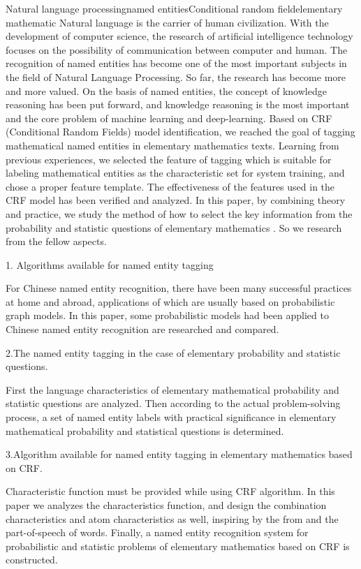 
\begin{Eabstract}{Natural language processing}{named entities}{Conditional random field}{elementary mathematic}{}
Natural language is the carrier of human civilization. With the development of computer science, the research of artificial intelligence technology focuses on the possibility of communication between computer and human. The recognition of named entities has become one of the most important subjects in the field of Natural Language Processing. So far, the research has become more and more valued. On the basis of named entities, the concept of knowledge reasoning has been put forward, and knowledge reasoning is the most important and the core problem of machine learning and deep-learning. 
Based on CRF (Conditional Random Fields) model identification, we reached the goal of tagging mathematical named entities in elementary mathematics texts. Learning from previous experiences, we selected the feature of tagging which is suitable for labeling mathematical entities as the characteristic set for system training, and chose a proper feature template. The effectiveness of the features used in the CRF model has been verified and analyzed. 
In this paper, by combining theory and practice, we study the method of how to select the key information from the probability and statistic questions of elementary mathematics . So we research from the fellow aspects.

1. Algorithms available for named entity tagging

For Chinese named entity recognition, there have been many successful practices at home and abroad, applications of which are usually based on probabilistic graph models. In this paper, some probabilistic models had been applied to Chinese named entity recognition are researched and compared.

2.The named entity tagging in the case of elementary probability and statistic questions.

First the language characteristics of elementary mathematical probability and statistic questions are analyzed. Then according to the actual problem-solving process, a set of named entity labels with practical significance in elementary mathematical probability and statistical questions is determined.

3.Algorithm available for named entity tagging in elementary mathematics based on CRF.

Characteristic function must be provided while using CRF algorithm. In this paper  we analyzes the characteristics function, and design the combination characteristics and atom characteristics as well, inspiring by the from and the part-of-speech of words. 
Finally, a named entity recognition system for probabilistic and statistic problems of elementary mathematics based on CRF is constructed.
\end{Eabstract}
